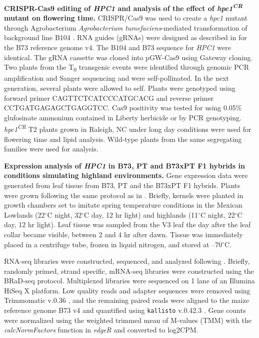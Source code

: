 \documentclass[9pt,twocolumn,twoside,lineno]{biorxiv}
\begin{document}
\textbf{CRISPR-Cas9 editing of \textit{HPC1} and analysis of the effect of \textit{hpc1\textsuperscript{CR}} mutant on flowering time.}
CRISPR/Cas9 was used to create a \textit{hpc1} mutant through Agrobacterium \textit{Agrobacterium tumefaciens}-mediated transformation of background line B104 \cite{Wu2020-nq, Char2017-uk}. 
RNA guides (gRNAs) were designed as described in \cite{Brazelton2015-co} for the B73 reference genome v4. 
The B104 and B73 sequence for \textit{HPC1} were identical. 
The gRNA cassette was cloned into pGW-Cas9 using Gateway cloning. 
Two plants from the T\textsubscript{0} transgenic events were identified through genomic PCR amplification and Sanger sequencing and were self-pollinated. 
In the next generation, several plants were allowed to self.
Plants were genotyped using forward primer CAGTTCTCATCCCATGCACG and reverse primer CCTGATGAGAGCTGAGGTCC.
Cas9 positivity was tested for using 0.05\% glufosinate ammonium contained in Liberty herbicide or by PCR genotyping. 
\textit{hpc1\textsuperscript{CR}} T2 plants grown in Raleigh, NC under long day conditions were used for flowering time and lipid analysis.
Wild-type plants from the same segregating families were used for analysis.

\textbf{Expression analysis of \textit{HPC1} in B73, PT and B73xPT F1 hybrids in conditions simulating highland environments.}
Gene expression data were generated from leaf tissue from B73, PT and the B73xPT F1 hybrids. 
Plants were grown following the same protocol as in \cite{Crow2020-gene}.
Briefly, kernels were planted in growth chambers set to imitate spring temperature conditions in the Mexican Lowlands (22$^{\circ}$C night, 32$^{\circ}$C day, 12 hr light) and highlands (11$^{\circ}$C night, 22$^{\circ}$C day, 12 hr light). 
Leaf tissue was sampled from the V3 leaf the day after the leaf collar became visible, between 2 and 4 hr after dawn. 
Tissue was immediately placed in a centrifuge tube, frozen in liquid nitrogen, and stored at --70$^{\circ}$C.

RNA-seq libraries were constructed, sequenced, and analyzed following \cite{Crow2020-gene}. 
Briefly, randomly primed, strand specific, mRNA-seq libraries were constructed using the BRaD-seq \cite{townsley2015brad} protocol.
Multiplexed libraries were sequenced on 1 lane of an Illumina HiSeq X platform. 
Low quality reads and adapter sequences were removed using Trimmomatic v.0.36 \cite{bolger2014trimmomatic}, and the remaining paired reads were aligned to the maize reference genome B73 v4 and quantified using \texttt{kallisto} v.0.42.3 \cite{bray2016near}. 
Gene counts were normalized using the weighted trimmed mean of M-values (TMM) with the \textit{calcNormFactors} function in \textit{edgeR} \cite{robinson2010edger} and converted to log2CPM.
\end{document}
